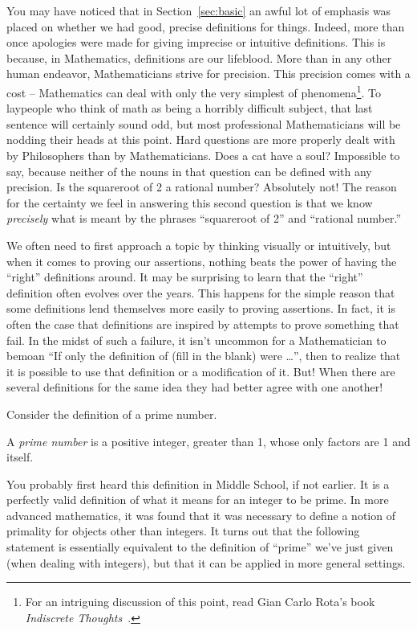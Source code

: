 You may have noticed that in Section~\ref{sec:basic} an awful lot of
emphasis was placed on whether we had good, precise definitions
for things.  Indeed, more than once apologies were made for giving
imprecise or intuitive definitions.  This is because, in Mathematics,
definitions are our lifeblood.  More than in any other human 
endeavor, Mathematicians strive for precision.  This precision
comes with a cost -- Mathematics can deal with only the very 
simplest of phenomena\footnote{For an intriguing discussion of this 
point, read Gian Carlo Rota's book {\em Indiscrete Thoughts}~\cite{rota}.}.  
To laypeople who think of math as being
a horribly difficult subject, that last sentence will certainly 
sound odd, but most professional Mathematicians will be nodding 
their heads at this point.  Hard questions are more properly dealt 
with by Philosophers than by Mathematicians.  Does a cat have 
a soul?  Impossible
to say, because neither of the nouns in that question can be 
defined with any precision.  Is the squareroot of 2 a rational number?
Absolutely not!  The reason
for the certainty we feel in answering this second question is
that we know {\em precisely} what is meant by the phrases 
``squareroot of 2'' and ``rational number.''

We often need to first approach
a topic by thinking visually or intuitively, but when it comes to
proving our assertions, nothing beats the power of having the
``right'' definitions around.  It may be surprising to learn that
the ``right'' definition often evolves over the years.  This 
happens for the simple reason that some definitions lend themselves
more easily to proving assertions.  In fact, it is often the case
that definitions are inspired by attempts to prove something that 
fail.  In the midst of such a failure, it isn't uncommon for a 
Mathematician to bemoan ``If only the definition of (fill in the 
blank) were \ldots'', then to realize that it is possible to
use that definition or a modification of it.  But! When there are 
several definitions
for the same idea they had better agree with one another!  

Consider the definition of a prime number. 

\begin{defi} 
A {\em prime number} is a positive integer,
greater than 1, whose only factors are 1 and itself.
\end{defi}

You probably first heard this definition in Middle School, if not
earlier.  It is a perfectly valid definition of what it means 
for an integer to be prime.  In more advanced mathematics, it
was found that it was necessary to define a notion of primality
for objects other than integers.  It turns out that the following
statement is essentially equivalent to the definition of ``prime'' we've just
given (when dealing with integers), but that it can be applied in 
more general settings.

